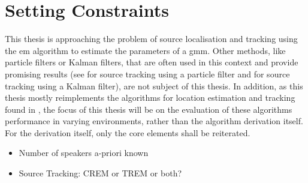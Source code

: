 \section{Setting Constraints}
\label{chap:1constraints}

This thesis is approaching the problem of source localisation and tracking using the \gls{em} algorithm to estimate the parameters of a \gls{gmm}. Other methods, like particle filters or Kalman filters, that are often used in this context and provide promising results (see \cite{Lehmann2007} for source tracking using a particle filter and \cite{Gannot2012} for source tracking using a Kalman filter), are not subject of this thesis. In addition, as this thesis mostly reimplements the algorithms for location estimation and tracking found in \cite{Schwartz2014}, the focus of this thesis will be on the evaluation of these algorithms performance in varying environments, rather than the algorithm derivation itself. For the derivation itself, only the core elements shall be reiterated.
\begin{itemize}
	\item Number of speakers a-priori known
	\item Source Tracking: CREM or TREM or both?
\end{itemize}
